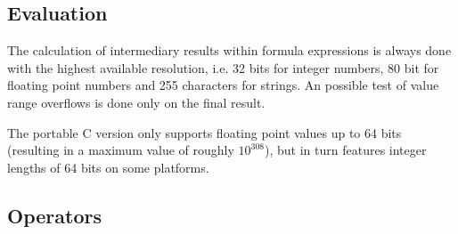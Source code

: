 \documentclass[12pt,twoside]{report}
\begin{document}
\subsection{Evaluation}

The calculation of intermediary results within formula expressions is
always done with the highest available resolution, i.e. 32 bits for
integer numbers, 80 bit for floating point numbers and 255 characters
for strings.  An possible test of value range overflows is done only
on the final result.

The portable C version  only supports floating 
point values up to 64 bits (resulting in a maximum value of roughly
$10^{308}$), but in turn features integer lengths of 64 bits on some
platforms.

\subsection{Operators}
\end{document}
